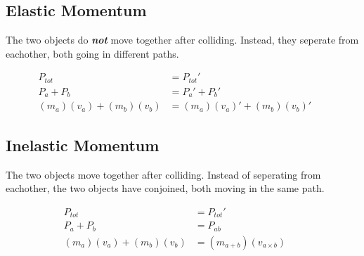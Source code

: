 \documentclass{article}
\begin{document}
\begin{adjustwidth}{1cm}{0pt}
    \subsection{Elastic Momentum}
    \begin{flushleft}
        The two objects do \textbf{\textit{not}} move together after colliding. Instead, they seperate from eachother, both going in different paths.
    \end{flushleft}
    \begin{align*}
        P_{tot}                         & = P_{tot}\prime                                    \\
        P_{a} + P_{b}                   & = P_{a}\prime + P_{b}\prime                        \\
        (m_{a})(v_{a}) + (m_{b})(v_{b}) & = (m_{a})(v_{a})\prime + (m_{b})(v_{b})\prime &  &
    \end{align*}
    \vspace*{0.03cm}
    \subsection{Inelastic Momentum}
    \begin{flushleft}
        The two objects move together after colliding. Instead of seperating from eachother, the two objects have conjoined, both moving in the same path.
    \end{flushleft}
    \begin{align*}
        P_{tot}                         & = P_{tot}\prime                   \\
        P_{a} + P_{b}                   & = P_{ab}                          \\
        (m_{a})(v_{a}) + (m_{b})(v_{b}) & = (m_{a + b})(v_{a\times b}) &  &
    \end{align*}
\end{adjustwidth}
\end{document}
